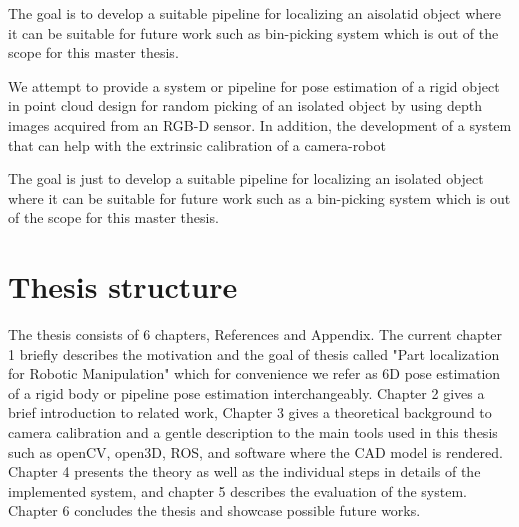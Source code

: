 The goal is to develop a suitable pipeline for localizing an aisolatid object where it can be suitable for future work such as bin-picking system which is out of the scope for this master thesis.
\fi

We attempt to provide a system or pipeline for pose estimation of a rigid object in point cloud design for random picking of an isolated object by using depth images acquired from an RGB-D sensor. In addition, the development of a system that can help with the extrinsic calibration of a camera-robot

The goal is just to develop a suitable pipeline for localizing an isolated object where it can be suitable for future work such as a bin-picking system which is out of the scope for this master thesis.


\section{Thesis structure}

The thesis consists of 6 chapters, References and Appendix. The current chapter 1 briefly describes the motivation and the goal of thesis called "Part localization for Robotic Manipulation" which for convenience we refer as 6D pose estimation of a rigid body or pipeline pose estimation interchangeably. Chapter 2 gives a brief introduction to related work, Chapter 3 gives a theoretical background to camera calibration and a gentle description to the main tools used in this thesis such as openCV, open3D, ROS, and software where the CAD model is rendered. Chapter 4 presents the theory as well as the individual steps in details of the implemented system, and chapter 5 describes the evaluation of the system. Chapter 6 concludes the thesis and showcase possible future works.

